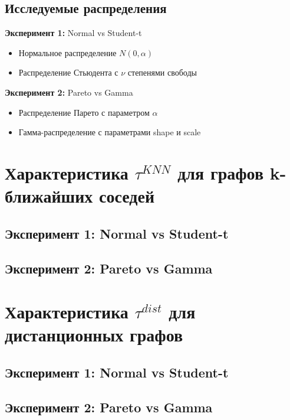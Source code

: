 \documentclass[a4paper,12pt]{report}
\begin{document}
\subsection{Исследуемые распределения}
\textbf{Эксперимент 1:} Normal vs Student-t
\begin{itemize}
    \item Нормальное распределение $N(0, \alpha)$
    \item Распределение Стьюдента с $\nu$ степенями свободы
\end{itemize}

\textbf{Эксперимент 2:} Pareto vs Gamma
\begin{itemize}
    \item Распределение Парето с параметром $\alpha$
    \item Гамма-распределение с параметрами shape и scale
\end{itemize}

\section{Характеристика $\tau^{KNN}$ для графов k-ближайших соседей}

\subsection{Эксперимент 1: Normal vs Student-t}

\subsection{Эксперимент 2: Pareto vs Gamma}

\section{Характеристика $\tau^{dist}$ для дистанционных графов}

\subsection{Эксперимент 1: Normal vs Student-t}

\subsection{Эксперимент 2: Pareto vs Gamma}
\end{document}
